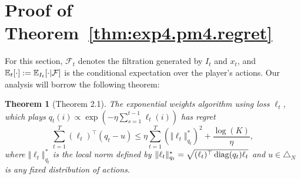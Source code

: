 \documentclass{article}
\newtheorem{theorem}{Theorem}
\begin{document}
\newpage



\newpage
\appendix
\section{Proof of Theorem~\ref{thm:exp4.pm4.regret}}
\label{sec:ew.proof}
For this section, $\mathcal F_t$ denotes the filtration generated by $I_t$ and $x_t$, and $\mathbb E_t[\cdot]:=\mathbb E_{I_t}[\cdot|\mathcal F]$ is the conditional expectation over the player's actions. Our analysis will borrow the following theorem:
\begin{theorem}[\cite{abernethy2009beating}Theorem 2.1]
  \label{thm:ew.regret}
  The exponential weights algorithm using loss $\ell_t$, which plays $q_t(i) \propto \exp(-\eta\sum_{s=1}^{t-1} \ell_t(i))$ has regret
  \begin{equation}
\label{eqn:ew.regret}
  \sum_{t=1}^T (\ell_t)^\top (q_t - u)\leq \eta \sum_{t=1}^T (\Vert \ell_t\Vert_{q_t}^*)^2 + \frac{\log (K)}{\eta},
\end{equation}
where $\Vert \ell_t\Vert_{q_t}^*$ is the local norm defined by
$
  \Vert \ell_t\Vert_{q_t}^*
  =
  \sqrt{(\ell_t)^\top \operatorname*{diag}(q_t) \ell_t}$
  and $u\in\triangle_N$ is any fixed distribution of actions.
\end{theorem}
\end{document}
